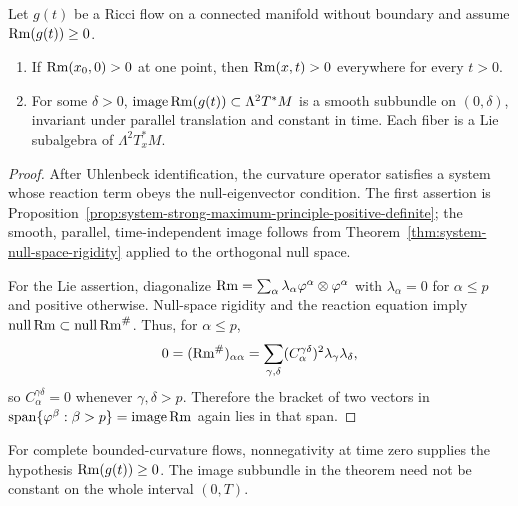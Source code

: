 \begin{theorem}
\label{thm:curvature-operator-strong-maximum-principle}

Let $g(t)$ be a Ricci flow on a connected manifold without boundary and assume
$\operatorname{Rm}(g(t))\geq0$.
\begin{enumerate}
\item If $\operatorname{Rm}(x_0,0)>0$ at one point, then $\operatorname{Rm}(x,t)>0$ everywhere for every
$t>0$.
\item For some $\delta>0$, $\operatorname{image}\operatorname{Rm}(g(t))\subset
\Lambda^2T^*M$ is a smooth subbundle on $(0,\delta)$, invariant under parallel
translation and constant in time.  Each fiber is a Lie subalgebra of
$\Lambda^2T_x^*M$.
\end{enumerate}
\end{theorem}

\begin{proof}
\sketch
{}
After Uhlenbeck identification, the curvature operator satisfies a system
whose reaction term obeys the null-eigenvector condition.  The first assertion
is Proposition~\ref{prop:system-strong-maximum-principle-positive-definite};
the smooth, parallel, time-independent image follows from
Theorem~\ref{thm:system-null-space-rigidity} applied to the orthogonal null
space.

For the Lie assertion, diagonalize
$\operatorname{Rm}=\sum_\alpha\lambda_\alpha\varphi^\alpha\otimes\varphi^\alpha$ with
$\lambda_\alpha=0$ for $\alpha\leq p$ and positive otherwise.  Null-space
rigidity and the reaction equation imply
$\operatorname{null}\operatorname{Rm}\subset\operatorname{null}\operatorname{Rm}^\#$.  Thus, for
$\alpha\leq p$,
\[
0=(\operatorname{Rm}^\#)_{\alpha\alpha}
=\sum_{\gamma,\delta}(C_\alpha^{\gamma\delta})^2
\lambda_\gamma\lambda_\delta,
\]
so $C_\alpha^{\gamma\delta}=0$ whenever $\gamma,\delta>p$.  Therefore the
bracket of two vectors in
$\operatorname{span}\{\varphi^\beta:\beta>p\}=\operatorname{image}\operatorname{Rm}$
again lies in that span.
\end{proof}

\begin{remark}
\label{rem:curvature-operator-image-time-interval}


For complete bounded-curvature flows, nonnegativity at time zero supplies the
hypothesis $\operatorname{Rm}(g(t))\geq0$.  The image subbundle in the theorem need not be
constant on the whole interval $(0,T)$.
\end{remark}

